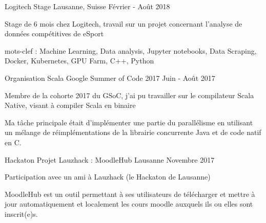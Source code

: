 \begin{cventries}
	

\cventry
{Logitech} %
{Stage} %
{Lausanne, Suisse} %
{Février - Août 2018} %
{ %
	\begin{cvitems}
		\item {Stage de 6 mois chez Logitech, travail sur un projet concernant l'analyse de données compétitives de eSport}
		\item {mots-clef : Machine Learning, Data analysis, Jupyter notebooks, Data Scraping, Docker, Kubernetes, GPU Farm, C++, Python}
	\end{cvitems}
}
	

\cventry
{Organisation Scala} %
{Google Summer of Code 2017} %
{} %
{Juin - Août 2017} %
{ %
\begin{cvitems}
\item {Membre de la cohorte 2017 du GSoC, j'ai pu travailler sur le compilateur Scala Native, visant à compiler Scala en binaire}
\item {Ma tâche principale était d'implémenter une partie du parallélisme en utilisant un mélange de réimplémentations de la librairie concurrente Java et de code natif en C.}
\end{cvitems}
}


\cventry
{Hackaton} %
{Projet Lauzhack : MoodleHub} %
{Lausanne} %
{Novembre 2017} %
{ %
	\begin{cvitems}
		\item {Participation avec un ami à Lauzhack (le Hackaton de Lausanne)}
		\item {MoodleHub est un outil permettant à ses utilisateurs de télécharger et mettre à jour automatiquement et localement les cours moodle auxquels ils ou elles sont inscrit(e)s.}
	\end{cvitems}
}




\end{cventries}
